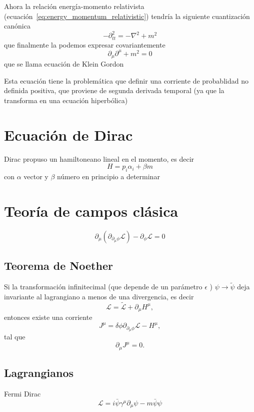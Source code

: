 \documentclass[a4paper]{article}
\newcommand{\Lagr}{\mathcal{L}}
\newcommand{\du}{\partial}
\begin{document}
 Ahora la relación energía-momento relativista (ecuación~\ref{eq:energy_momentum_relativistic})
tendría la siguiente cuantización canónica
\[
- \du^2_{tt} = - \nabla^2 + m^2
\]
\noindent que finalmente la podemos expresar covariantemente
\[
\du_\mu \du^\mu + m^2 = 0
\]
\noindent que se llama ecuación de Klein Gordon

 Esta ecuación tiene la problemática que definir una corriente de probablidad no definida positiva, que proviene de segunda derivada temporal (ya que la transforma en una ecuación hiperbólica)

\section{Ecuación de Dirac}\label{ sec:ecuacin-de-dirac}


\noindent Dirac propuso un hamiltoneano lineal en el momento, es decir
\[H = p_i \alpha_i + \beta m\]
con  $\alpha$  vector y  $\beta$ número en principio a determinar


\section{Teoría de campos clásica}\label{ sec:campos}
\begin{equation}
\du_\mu \left(\du_{\du_\mu\phi} \Lagr\right) - \du_{\phi} \Lagr = 0
\label{eq:euler_lagrange}
\end{equation}


\subsection{Teorema de Noether}\label{ sec:noether}
Si la transformación infinitecimal (que depende de un parámetro  $\epsilon$ )  $\psi \to \tilde{\psi}$  deja invariante al lagrangiano a menos de una divergencia, es decir
\[\Lagr = \tilde{\Lagr} + \du_\mu H^\mu,\]
entonces existe una corriente 
\[J^\mu = \delta \phi \du_{\du_\mu \phi} \Lagr - H^\mu,\]
tal que 
\[\du_\mu J^\mu = 0.\]


\subsection{Lagrangianos}\label{ sec:lagrangianos}


\noindent Fermi Dirac
\begin{equation}
\Lagr = i \bar{\psi} \gamma^{\mu} \du_\mu \psi - m \bar{\psi} \psi
\label{eq:fermionic}
\end{equation}
\end{document}
